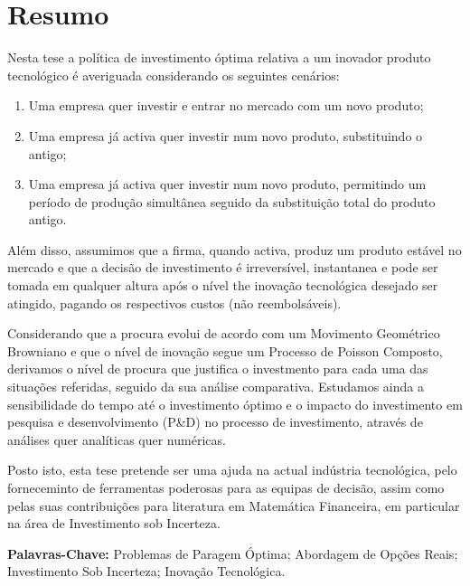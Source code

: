 
\section*{Resumo}



Nesta tese a política de investimento óptima relativa a um inovador produto tecnológico é averiguada considerando os seguintes cenários:
\begin{enumerate}
	\item Uma empresa quer investir e entrar no mercado com um novo produto;
	\item Uma empresa já activa quer investir num novo produto, substituindo o antigo; 
	\item Uma empresa já activa quer investir num novo produto, permitindo um período de produção simultânea seguido da substituição total do produto antigo.
\end{enumerate}

Além disso, assumimos que a firma, quando activa, produz um produto estável no mercado e que a decisão de investimento é irreversível, instantanea e pode ser tomada em qualquer altura após o nível the inovação tecnológica desejado ser atingido, pagando os respectivos custos (não reembolsáveis).

Considerando que a procura evolui de acordo com um Movimento Geométrico Browniano e que o nível de inovação segue um Processo de Poisson Composto, derivamos o nível de procura que justifica o investmento para cada uma das situações referidas, seguido da sua análise comparativa. Estudamos ainda a sensibilidade do tempo até o investimento óptimo e o impacto do investimento em pesquisa e desenvolvimento (P\&D) no processo de investimento, através de análises quer analíticas quer numéricas.

Posto isto, esta tese pretende ser uma ajuda na actual indústria tecnológica, pelo forneceminto de ferramentas poderosas para as equipas de decisão, assim como pelas suas contribuições para literatura em Matemática Financeira, em particular na área de Investimento sob Incerteza.






\vfill

\textbf{\Large Palavras-Chave:} Problemas de Paragem Óptima; Abordagem de Opções Reais; Investimento Sob Incerteza; Inovação Tecnológica.
